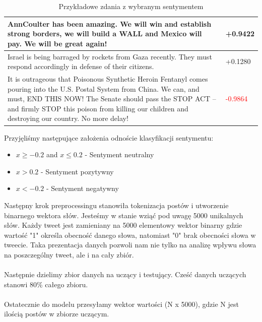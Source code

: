 \documentclass{article}
\begin{document}
    \begin{table}[!h]
    \begin{center}
    \begin{tabular}{ | p{9cm} | l | }
    \hline
        AnnCoulter has been amazing. We will win and establish strong borders, we will build a WALL and Mexico will pay. We will be great again! &  \textcolor{green!50!black}{+0.9422 }\\ \hline 
         Israel is being barraged by rockets from Gaza recently. They must respond accordingly in defense of their citizens. & 
        \textcolor{yellow!40!orange!55!green}{+0.1280} \\ \hline 
        It is outrageous that Poisonous Synthetic Heroin Fentanyl comes pouring into the U.S. Postal System from China. We can, and must, END THIS NOW! The Senate should pass the STOP ACT – and firmly STOP this poison from killing our children and destroying our country. No more delay!  & \textcolor{red}{-0.9864}
         
         \\ 
    \hline
    \end{tabular}
    \caption{\label{table}Przykładowe zdania z wybranym sentymentem}
    \end{center}
    \end{table}

    \noindent Przyjęliśmy następujące założenia odnoście klasyfikacji sentymentu:
    \begin{itemize}
      \item $x \ge -0.2$ and $x \le 0.2$ - Sentyment neutralny
      \item $x > 0.2$ - Sentyment pozytywny
      \item $x < -0.2$ - Sentyment negatywny
    \end{itemize}
    
    \noindent Następny krok preprocessingu stanowiła tokenizacja postów i utworzenie binarnego wektora słów. Jesteśmy w stanie wziąć pod uwagę 5000 unikalnych słów. Każdy tweet jest zamieniany na 5000 elementowy wektor binarny gdzie wartość "1" określa obecność danego słowa, natomiast "0" brak obecności słowa w tweecie. Taka prezentacja danych pozwoli nam nie tylko na analizę wpływu słowa na poszczególny tweet, ale i na cały zbiór.
    \\
    \\
    \noindent Następnie dzielimy zbior danych na uczący i testujący. Cześć danych uczących stanowi 80\% całego zbioru.
    \\
    \\
    \noindent Ostatecznie do modelu przesyłamy wektor wartości (N x 5000), gdzie N jest ilością postów w zbiorze uczącym. 
    
\end{document}
